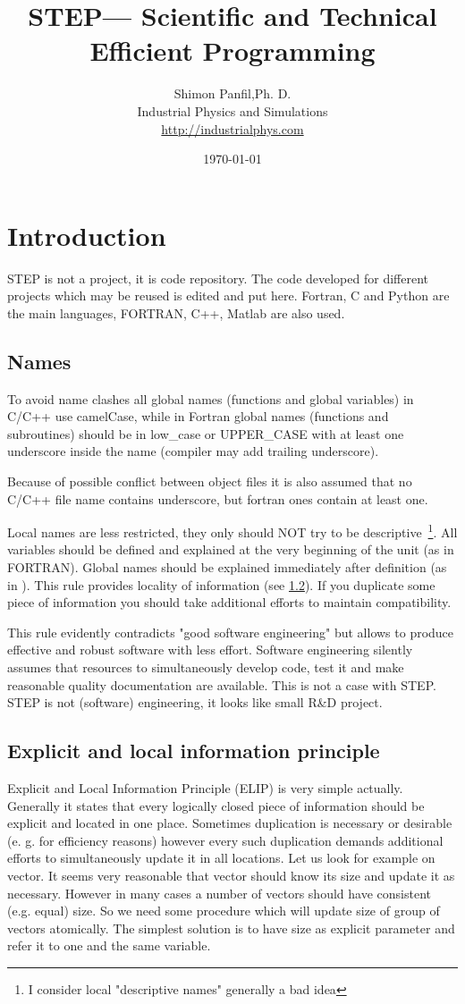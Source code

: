 \documentclass[a4paper]{report}
\title {STEP--- Scientific and Technical Efficient Programming}
\author{Shimon Panfil,Ph. D. \\
    Industrial Physics and Simulations \\
    \href{http://industrialphys.com}{http://industrialphys.com}
}
\date{\today}
\begin{document}
\maketitle
\chapter{Introduction}
STEP is not a project, it is code repository. The code developed for different projects which may be reused 
is edited and put here. Fortran, C and Python are the main languages, FORTRAN, C++, Matlab are also used.
\section{Names}
To avoid name clashes all global names (functions and global variables) in C/C++ use camelCase, while in Fortran global names (functions and subroutines) should be in low\_case or UPPER\_CASE with at least one underscore inside the name (compiler may add trailing underscore). 

Because of possible conflict between object files it is also assumed that no C/C++ file name contains underscore, but fortran ones contain at least one.

Local names are less restricted, they only should NOT try to be descriptive~\footnote{I consider local "descriptive names" generally a bad idea}. All variables should be defined and explained at the very beginning of the unit (as in FORTRAN). Global names should be explained immediately after definition (as in \cite {nr3}). This rule provides locality of information (see \ref{elinfp}). If you duplicate some piece of information you should take additional efforts to maintain compatibility. 

This rule evidently contradicts "good software engineering" but allows to produce effective and robust software with less effort. Software engineering silently assumes that resources to simultaneously develop code, test it and make reasonable quality documentation are available. This is not a case with STEP. STEP is not (software) engineering, it looks like small  R\&D project.

\section{Explicit and local information principle}
\label {elinfp}
Explicit and Local Information Principle (ELIP) is very simple actually. Generally it states that every logically closed piece of information should be explicit and located in one place. Sometimes duplication is necessary or desirable (e. g. for efficiency reasons) however every such duplication demands additional efforts to simultaneously update it in all locations. Let us look for example on vector. It seems very reasonable that vector should know its size and update it as necessary. However in many cases a number of vectors should have consistent (e.g. equal) size. So we need some procedure which will update size of group of vectors atomically. The simplest  solution is to have size as explicit parameter and refer it to one and the same variable.
\end{document}
